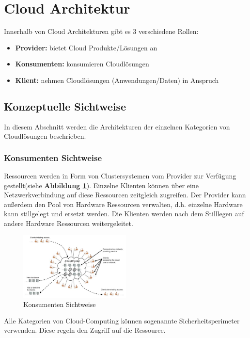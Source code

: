 \section{Cloud Architektur}

Innerhalb von Cloud Architekturen gibt es 3 verschiedene Rollen:
\begin{itemize}
	\item \textbf{Provider:} bietet Cloud Produkte/Lösungen an
	\item \textbf{Konsumenten:} konsumieren Cloudlösungen
	\item \textbf{Klient:} nehmen Cloudlösungen (Anwendungen/Daten) in Anspruch
\end{itemize}

\subsection{Konzeptuelle Sichtweise}

In diesem Abschnitt werden die Architekturen der einzelnen Kategorien von Cloudlösungen beschrieben.

\subsubsection{Konsumenten Sichtweise}
Ressourcen werden in Form von Clustersystemen vom Provider zur Verfügung gestellt(siehe \textbf{Abbildung \ref{ConsumerView}}).
Einzelne Klienten können über eine Netzwerkverbindung auf diese Ressourcen zeitgleich zugreifen. Der Provider kann außerdem den Pool
von Hardware Ressourcen verwalten, d.h. einzelne Hardware kann stillgelegt und ersetzt werden. Die Klienten werden nach dem Stilllegen
auf andere Hardware Ressourcen weitergeleitet.
\begin{figure}[h]
    \centering
	\includegraphics[width=0.5\textwidth]{Images/ConsumerView}
	\caption{Konsumenten Sichtweise \cite{Badger}}
	\label{ConsumerView}
\end{figure}
Alle Kategorien von Cloud-Computing können sogenannte Sicherheitsperimeter verwenden. Diese regeln den Zugriff auf die Ressource\cite{Badger}.

